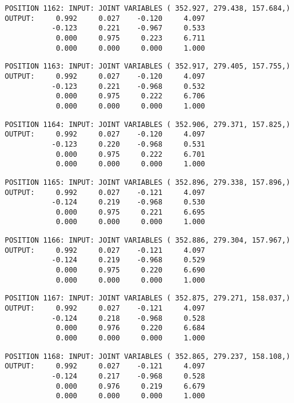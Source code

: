 \begin{verbatim}
POSITION 1162: INPUT: JOINT VARIABLES ( 352.927, 279.438, 157.684,)
OUTPUT:     0.992     0.027    -0.120     4.097
           -0.123     0.221    -0.967     0.533
            0.000     0.975     0.223     6.711
            0.000     0.000     0.000     1.000
\end{verbatim} \pagebreak[1]\begin{verbatim}
POSITION 1163: INPUT: JOINT VARIABLES ( 352.917, 279.405, 157.755,)
OUTPUT:     0.992     0.027    -0.120     4.097
           -0.123     0.221    -0.968     0.532
            0.000     0.975     0.222     6.706
            0.000     0.000     0.000     1.000
\end{verbatim} \pagebreak[1]\begin{verbatim}
POSITION 1164: INPUT: JOINT VARIABLES ( 352.906, 279.371, 157.825,)
OUTPUT:     0.992     0.027    -0.120     4.097
           -0.123     0.220    -0.968     0.531
            0.000     0.975     0.222     6.701
            0.000     0.000     0.000     1.000
\end{verbatim} \pagebreak[1]\begin{verbatim}
POSITION 1165: INPUT: JOINT VARIABLES ( 352.896, 279.338, 157.896,)
OUTPUT:     0.992     0.027    -0.121     4.097
           -0.124     0.219    -0.968     0.530
            0.000     0.975     0.221     6.695
            0.000     0.000     0.000     1.000
\end{verbatim} \pagebreak[1]\begin{verbatim}
POSITION 1166: INPUT: JOINT VARIABLES ( 352.886, 279.304, 157.967,)
OUTPUT:     0.992     0.027    -0.121     4.097
           -0.124     0.219    -0.968     0.529
            0.000     0.975     0.220     6.690
            0.000     0.000     0.000     1.000
\end{verbatim} \pagebreak[1]\begin{verbatim}
POSITION 1167: INPUT: JOINT VARIABLES ( 352.875, 279.271, 158.037,)
OUTPUT:     0.992     0.027    -0.121     4.097
           -0.124     0.218    -0.968     0.528
            0.000     0.976     0.220     6.684
            0.000     0.000     0.000     1.000
\end{verbatim} \pagebreak[1]\begin{verbatim}
POSITION 1168: INPUT: JOINT VARIABLES ( 352.865, 279.237, 158.108,)
OUTPUT:     0.992     0.027    -0.121     4.097
           -0.124     0.217    -0.968     0.528
            0.000     0.976     0.219     6.679
            0.000     0.000     0.000     1.000
\end{verbatim} \pagebreak[1]\begin{verbatim}

\end{verbatim}
